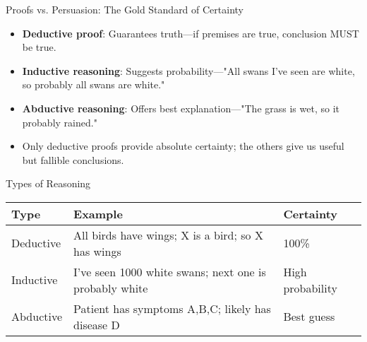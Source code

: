 \documentclass{beamer}
\begin{document}
	\begin{frame}{Proofs vs. Persuasion: The Gold Standard of Certainty}
		\begin{itemize}
			\item \textbf{Deductive proof}: Guarantees truth—if premises are true, conclusion MUST be true.
			\item \textbf{Inductive reasoning}: Suggests probability—"All swans I've seen are white, so probably all swans are white."
			\item \textbf{Abductive reasoning}: Offers best explanation—"The grass is wet, so it probably rained."
			\item Only deductive proofs provide absolute certainty; the others give us useful but fallible conclusions.
		\end{itemize}
		
		\begin{alertblock}{Types of Reasoning}
			\scriptsize{
			\begin{tabular}{|l|l|l|}
				\hline
				\textbf{Type} & \textbf{Example} & \textbf{Certainty} \\
				\hline
				Deductive & All birds have wings; X is a bird; so X has wings & 100\% \\
				Inductive & I've seen 1000 white swans; next one is probably white & High probability \\
				Abductive & Patient has symptoms A,B,C; likely has disease D & Best guess \\
				\hline
			\end{tabular}
		}
		\end{alertblock}
	\end{frame}
	
\end{document}
